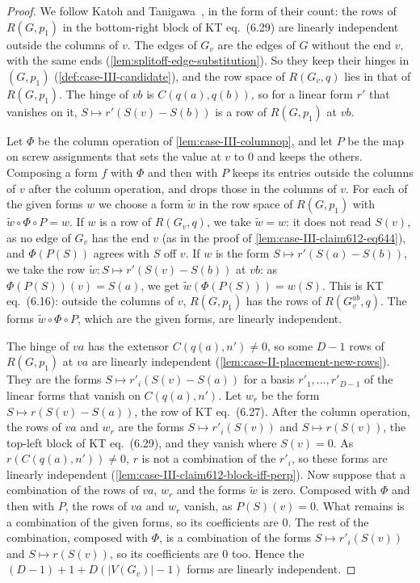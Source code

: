 \begin{proof}
  \leanok
  We follow Katoh and Tanigawa~\cite[pp.~684--686]{katohTanigawa2011},
  in the form of their count: the rows of $R(G, p_1)$ in the bottom-right
  block of KT eq.~(6.29) are linearly independent outside the columns of
  $v$. The edges of $G_v$ are the edges of $G$ without the end $v$, with
  the same ends (\cref{lem:splitoff-edge-substitution}). So they keep
  their hinges in $(G, p_1)$ (\cref{def:case-III-candidate}), and the row
  space of $R(G_v, q)$ lies in that of $R(G, p_1)$. The hinge of $vb$ is
  $C(q(a), q(b))$, so for a linear form $r'$ that vanishes on it,
  $S \mapsto r'(S(v) - S(b))$ is a row of $R(G, p_1)$ at $vb$.

  Let $\Phi$ be the column operation of \cref{lem:case-III-columnop},
  and let $P$ be the map on screw assignments that sets the value at $v$
  to $0$ and keeps the others. Composing a form $f$ with $\Phi$ and then
  with $P$ keeps its entries outside the columns of $v$ after the column
  operation, and drops those in the columns of $v$. For each of the
  given forms $w$ we choose a form $\tilde w$ in the row space of
  $R(G, p_1)$ with $\tilde w \circ \Phi \circ P = w$. If $w$ is a row of
  $R(G_v, q)$, we take $\tilde w = w$: it does not read $S(v)$, as no
  edge of $G_v$ has the end $v$ (as in the proof of
  \cref{lem:case-III-claim612-eq644}), and $\Phi(P(S))$ agrees with $S$
  off $v$. If $w$ is the form $S \mapsto r'(S(a) - S(b))$, we take the
  row $\tilde w \colon S \mapsto r'(S(v) - S(b))$ at $vb$: as
  $\Phi(P(S))(v) = S(a)$, we get $\tilde w(\Phi(P(S))) = w(S)$. This is
  KT eq.~(6.16): outside the columns of $v$, $R(G, p_1)$ has the rows of
  $R(G_v^{ab}, q)$. The forms $\tilde w \circ \Phi \circ P$, which are
  the given forms, are linearly independent.

  The hinge of $va$ has the extensor $C(q(a), n') \neq 0$, so some
  $D - 1$ rows of $R(G, p_1)$ at $va$ are linearly independent
  (\cref{lem:case-II-placement-new-rows}). They are the forms
  $S \mapsto r'_i(S(v) - S(a))$ for a basis $r'_1, \dots, r'_{D-1}$ of
  the linear forms that vanish on $C(q(a), n')$. Let $w_r$ be the form
  $S \mapsto r(S(v) - S(a))$, the row of KT eq.~(6.27). After the column
  operation, the rows of $va$ and $w_r$ are the forms
  $S \mapsto r'_i(S(v))$ and $S \mapsto r(S(v))$, the top-left block of
  KT eq.~(6.29), and they vanish where $S(v) = 0$. As
  $r(C(q(a), n')) \neq 0$, $r$ is not a combination of the $r'_i$, so
  these forms are linearly independent
  (\cref{lem:case-III-claim612-block-iff-perp}). Now suppose that a
  combination of the rows of $va$, $w_r$ and the forms $\tilde w$ is
  zero. Composed with $\Phi$ and then with $P$, the rows of $va$ and
  $w_r$ vanish, as $P(S)(v) = 0$. What remains is a combination of the given forms, so
  its coefficients are $0$. The rest of the combination, composed with
  $\Phi$, is a combination of the forms $S \mapsto r'_i(S(v))$ and
  $S \mapsto r(S(v))$, so its coefficients are $0$ too. Hence the
  $(D - 1) + 1 + D(|V(G_v)| - 1)$ forms are linearly independent.


\end{proof}
